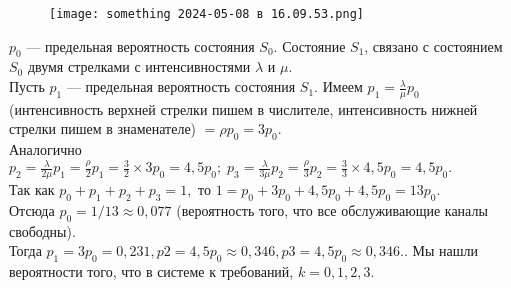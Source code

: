 \documentclass{article}
\begin{document}
\begin{figure}[h] 
\centering
\texttt{[image: something 2024-05-08 в 16.09.53.png]}
\label{fig:my_label}
\end{figure} 

\indent $p_0$ — предельная вероятность состояния $S_0$. Состояние $S_1$, связано с состоянием $S_0$ двумя стрелками с интенсивностями $\lambda$ и $\mu$. \\ 
\indent Пусть $p_1$ — предельная вероятность состояния $S_1$. Имеем $p_1 = \frac{\lambda}{\mu}p_0$  (интенсивность верхней стрелки пишем в числителе, интенсивность нижней  стрелки  пишем  в  знаменателе) $= \rho p_0 = 3p_0.$ \\ Аналогично $p_2 = \frac{\lambda}{2\mu}p_1 = \frac{\rho}{2}p_1 = \frac{3}{2}\times 3p_0 = 4,5p_0; \; p_3 = \frac{\lambda}{3\mu}p_2=\frac{\rho}{3}p_2 = \frac{3}{3}\times 4,5p_0 = 4,5p_0.$
\\ \indent Так как $p_0 + p_1 + p_2 + p_3 = 1,$ то $1 = p_0 + 3p_0 + 4,5p_0 + 4,5p_0 = 13p_0.$ \\
Отсюда $p_0 = 1 /13 \approx 0,077$ (вероятность того, что все обслуживающие каналы свободны). \\ Тогда $p_1 = 3p_0 = 0,231, p2 = 4,5p_0 \approx 0,346, p3 = 4,5p_0 \approx 0,346.$.  Мы  нашли  вероятности  того,  что  в  системе $к$ требований, $k = 0, 1, 2, 3.$  \\ \indent
\end{document}

